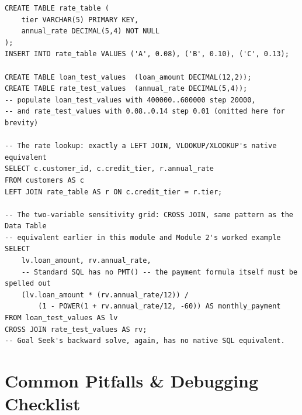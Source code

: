 \documentclass[11pt,a4paper]{article}
\begin{document}
\begin{lstlisting}[style=sqlstyle, caption={The lookup and the sensitivity grid, expressed as governed tables and a CROSS JOIN}]
CREATE TABLE rate_table (
    tier VARCHAR(5) PRIMARY KEY,
    annual_rate DECIMAL(5,4) NOT NULL
);
INSERT INTO rate_table VALUES ('A', 0.08), ('B', 0.10), ('C', 0.13);

CREATE TABLE loan_test_values  (loan_amount DECIMAL(12,2));
CREATE TABLE rate_test_values  (annual_rate DECIMAL(5,4));
-- populate loan_test_values with 400000..600000 step 20000,
-- and rate_test_values with 0.08..0.14 step 0.01 (omitted here for brevity)

-- The rate lookup: exactly a LEFT JOIN, VLOOKUP/XLOOKUP's native equivalent
SELECT c.customer_id, c.credit_tier, r.annual_rate
FROM customers AS c
LEFT JOIN rate_table AS r ON c.credit_tier = r.tier;

-- The two-variable sensitivity grid: CROSS JOIN, same pattern as the Data Table
-- equivalent earlier in this module and Module 2's worked example
SELECT
    lv.loan_amount, rv.annual_rate,
    -- Standard SQL has no PMT() -- the payment formula itself must be spelled out
    (lv.loan_amount * (rv.annual_rate/12)) /
        (1 - POWER(1 + rv.annual_rate/12, -60)) AS monthly_payment
FROM loan_test_values AS lv
CROSS JOIN rate_test_values AS rv;
-- Goal Seek's backward solve, again, has no native SQL equivalent.
\end{lstlisting}

\section{Common Pitfalls \& Debugging Checklist}
\end{document}
